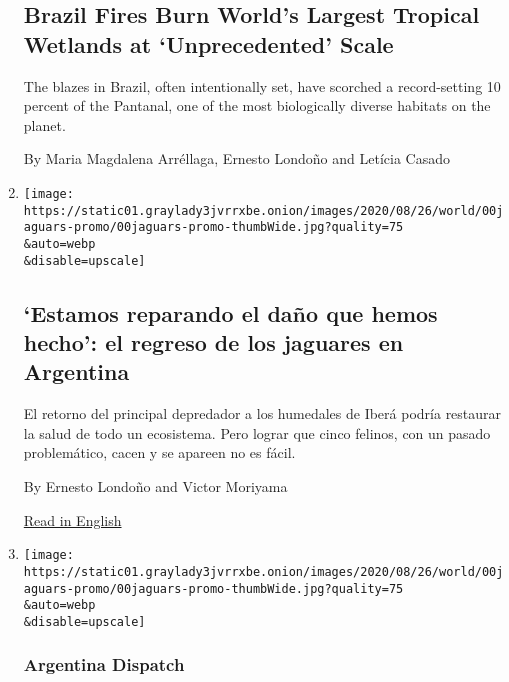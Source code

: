 \begin{enumerate}
  \hypertarget{brazil-fires-burn-worlds-largest-tropical-wetlands-at-unprecedented-scale}{%
  \subsection{Brazil Fires Burn World's Largest Tropical Wetlands at
  `Unprecedented'
  Scale}\label{brazil-fires-burn-worlds-largest-tropical-wetlands-at-unprecedented-scale}}

  The blazes in Brazil, often intentionally set, have scorched a
  record-setting 10 percent of the Pantanal, one of the most
  biologically diverse habitats on the planet.

  By Maria Magdalena Arréllaga, Ernesto Londoño and Letícia Casado
\item
  \href{/es/2020/09/01/espanol/america-latina/ibera-conservacion-jaguares-argentina.html}{}

  \texttt{[image: https://static01.graylady3jvrrxbe.onion/images/2020/08/26/world/00jaguars-promo/00jaguars-promo-thumbWide.jpg?quality=75\\\&auto=webp\\\&disable=upscale]}

  \hypertarget{estamos-reparando-el-dauxf1o-que-hemos-hecho-el-regreso-de-los-jaguares-en-argentina}{%
  \subsection{`Estamos reparando el daño que hemos hecho': el regreso de
  los jaguares en
  Argentina}\label{estamos-reparando-el-dauxf1o-que-hemos-hecho-el-regreso-de-los-jaguares-en-argentina}}

  El retorno del principal depredador a los humedales de Iberá podría
  restaurar la salud de todo un ecosistema. Pero lograr que cinco
  felinos, con un pasado problemático, cacen y se apareen no es fácil.

  By Ernesto Londoño and Victor Moriyama

  \href{https://www.nytimes3xbfgragh.onion/2020/09/01/world/americas/Jaguars-argentina-ibera.html}{Read
  in English}
\item
  \href{/2020/09/01/world/americas/Jaguars-argentina-ibera.html}{}

  \texttt{[image: https://static01.graylady3jvrrxbe.onion/images/2020/08/26/world/00jaguars-promo/00jaguars-promo-thumbWide.jpg?quality=75\\\&auto=webp\\\&disable=upscale]}

  \hypertarget{argentina-dispatch}{%
  \subsubsection{Argentina Dispatch}\label{argentina-dispatch}}


\end{enumerate}
